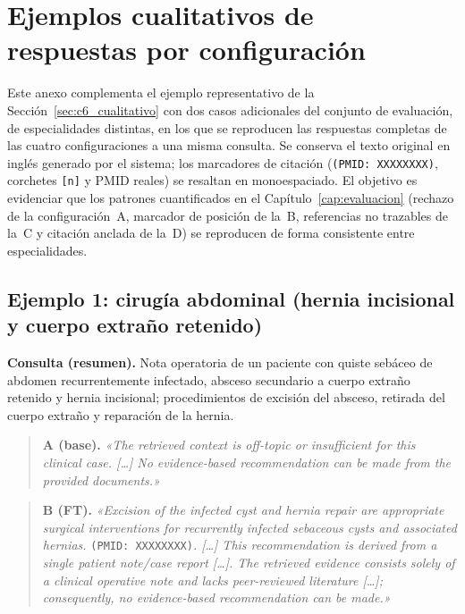 \documentclass[11pt,a4paper,spanish]{book}
\numberwithin{equation}{chapter}
\numberwithin{figure}{chapter}
\begin{document}
\chapter[Ejemplos cualitativos de respuestas por configuración]{Ejemplos cualitativos de\\ respuestas por configuración}
\label{anexo:cualitativo}

Este anexo complementa el ejemplo representativo de la Sección~\ref{sec:c6_cualitativo} con dos casos adicionales del conjunto de evaluación, de especialidades distintas, en los que se reproducen las respuestas completas de las cuatro configuraciones a una misma consulta. Se conserva el texto original en inglés generado por el sistema; los marcadores de citación (\texttt{(PMID:~XXXXXXXX)}, corchetes \texttt{[n]} y PMID reales) se resaltan en monoespaciado. El objetivo es evidenciar que los patrones cuantificados en el Capítulo~\ref{cap:evaluacion} (rechazo de la configuración~A, marcador de posición de la~B, referencias no trazables de la~C y citación anclada de la~D) se reproducen de forma consistente entre especialidades.

\section{Ejemplo 1: cirugía abdominal (hernia incisional y cuerpo extraño retenido)}
\label{anexo:cualitativo_ej1}

\textbf{Consulta (resumen).} Nota operatoria de un paciente con quiste sebáceo de abdomen recurrentemente infectado, absceso secundario a cuerpo extraño retenido y hernia incisional; procedimientos de excisión del absceso, retirada del cuerpo extraño y reparación de la hernia.

\begin{quote}\small
\textbf{A (base).} \emph{«The retrieved context is off-topic or insufficient for this clinical case. [\ldots] No evidence-based recommendation can be made from the provided documents.»}
\end{quote}

\begin{quote}\small
\textbf{B (FT).} \emph{«Excision of the infected cyst and hernia repair are appropriate surgical interventions for recurrently infected sebaceous cysts and associated hernias.} \texttt{(PMID: XXXXXXXX)}\emph{. [\ldots] This recommendation is derived from a single patient note/case report [\ldots]. The retrieved evidence consists solely of a clinical operative note and lacks peer-reviewed literature [\ldots]; consequently, no evidence-based recommendation can be made.»}
\end{quote}
\end{document}
